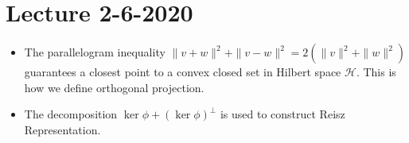 \section{Lecture 2-6-2020}
\begin{itemize}
    \item The parallelogram inequality $\|v+w\|^2 + \|v-w\|^2 = 2(\|v\|^2 + \|w\|^2)$ guarantees a closest point to a convex closed set in Hilbert space $\mathcal H$. This is how we define orthogonal projection.
    \item The decomposition $\ker \phi + (\ker \phi )^ \perp$ is used to construct Reisz Representation.
\end{itemize}

